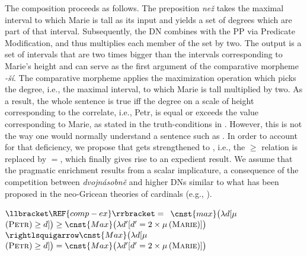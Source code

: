 \documentclass[output=paper,
modfonts,
hidelinks,
newtxmath
]{langscibook}
\begin{document}
\begin{exe}
\ex\label{tree-comp-dvojnasobne}%
%
\end{exe}

The composition proceeds as follows. The preposition \textit{než} takes the maximal interval to which Marie is tall as its input and yields a set of degrees which are part of that interval. Subsequently, the DN combines with the PP via Predicate Modification, and thus multiplies each member of the set by two. The output is a set of intervals that are two times bigger than the intervals corresponding to Marie's height and can serve as the first argument of the comparative morpheme \textit{-ší}. The comparative morpheme applies the maximization operation  which picks the degree, i.e., the maximal interval, to which Marie is tall multiplied by two. As a result, the whole sentence is true iff the degree on a scale of height corresponding to the correlate, i.e., Petr, is equal or exceeds the value corresponding to Marie, as stated in the truth-conditions in . However, this is not the way one would normally understand a sentence such as . In order to account for that deficiency, we propose that  gets strengthened to , i.e., the $\geq$ relation is replaced by $=$, which finally gives rise to an expedient result. We assume that the pragmatic enrichment results from a scalar implicature, a consequence of the competition between \textit{dvojnásobně} and higher DNs similar to what has been proposed in the neo-Gricean theories of cardinals (e.g., \citealt{horn1972semantic}).

\ea\label{tree-comp-dvojnasobne-semantics} $\llbracket \REF{comp-ex}\rrbracket ={}$
\ea $\cnst{max}\big(\lambda d[\mu$$(\textsc{Petr})\geq d]\big) \geq \cnst{Max}\big(\lambda d'[d'=2 \times \mu$$(\textsc{Marie})]\big)$\label{tree-comp-dvojnasobne-semantics-a}
\ex $\rightlsquigarrow\cnst{Max}\big(\lambda d[\mu$$(\textsc{Petr})\geq d]\big) = \cnst{Max}\big(\lambda d'[d'=2 \times \mu$$(\textsc{Marie})]\big)$\label{tree-comp-dvojnasobne-semantics-b}
\z \z
\end{document}
